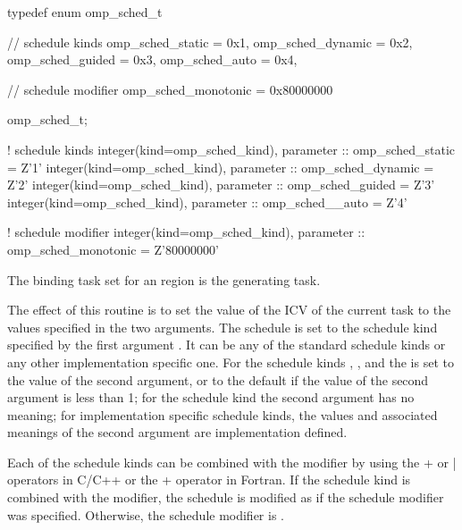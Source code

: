 \begin{ccppspecific}
\begin{ompcEnum}
typedef enum omp_sched_t {
  // schedule kinds
  omp_sched_static = 0x1,
  omp_sched_dynamic = 0x2,
  omp_sched_guided = 0x3,
  omp_sched_auto = 0x4,

  // schedule modifier
  omp_sched_monotonic = 0x80000000
} omp_sched_t;
\end{ompcEnum}
\end{ccppspecific}

\begin{samepage}
\begin{fortranspecific}
\begin{ompfEnum}
! schedule kinds
integer(kind=omp_sched_kind), parameter :: omp_sched_static = Z'1'
integer(kind=omp_sched_kind), parameter :: omp_sched_dynamic = Z'2'
integer(kind=omp_sched_kind), parameter :: omp_sched_guided = Z'3'
integer(kind=omp_sched_kind), parameter :: omp_sched__auto = Z'4'

! schedule modifier
integer(kind=omp_sched_kind),
  parameter :: omp_sched_monotonic = Z'80000000'
\end{ompfEnum}
\end{fortranspecific}
\end{samepage}

\binding
The binding task set for an  region is the generating task.

\effect
The effect of this routine is to set the value of the  ICV of the current task
to the values specified in the two arguments. The schedule is set to the schedule kind
specified by the first argument . It can be any of the standard schedule kinds or
any other implementation specific one. For the schedule kinds , , and
 the  is set to the value of the second argument, or to the default
 if the value of the second argument is less than 1; for the schedule kind
 the second argument has no meaning; for implementation specific schedule kinds,
the values and associated meanings of the second argument are implementation defined.

Each of the schedule kinds can be combined with the
 modifier by using the + or | operators in
C/C++ or the + operator in Fortran.  If the schedule kind is combined
with the  modifier, the schedule is modified
as if the  schedule modifier was specified.  Otherwise,
the schedule modifier is .


